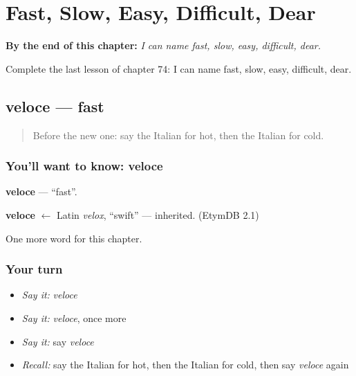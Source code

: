 
\chapter{Fast, Slow, Easy, Difficult, Dear}
\label{ch:it-fast-slow-easy-difficult-dear}

\begin{chapteropening}
\textbf{By the end of this chapter:} \emph{I can name fast, slow, easy, difficult, dear.}

Complete the last lesson of chapter 74: I can name fast, slow, easy, difficult, dear.
\end{chapteropening}

\section[veloce]{veloce — fast}

\label{lesson:IT-C74-veloce}



\begin{quote}
Before the new one: say the Italian for hot, then the Italian for cold.
\end{quote}

\subsection*{You'll want to know: veloce}
\textbf{veloce} — \textquotedblleft{}fast\textquotedblright{}.

\begin{cousinweb}
\textbf{veloce} $\leftarrow$ Latin \emph{velox}, \textquotedblleft{}swift\textquotedblright{} — inherited. (EtymDB 2.1)
\end{cousinweb}

\begin{grammarlens}[title={What you've built}]
One more word for this chapter.
\end{grammarlens}

\subsection*{Your turn}
\begin{itemize}
\raggedright
  \item \emph{Say it:} \emph{veloce}
  \item \emph{Say it:} \emph{veloce}, once more
  \item \emph{Say it:} say \emph{veloce}
  \item \emph{Recall:} say the Italian for hot, then the Italian for cold, then say \emph{veloce} again
\end{itemize}

